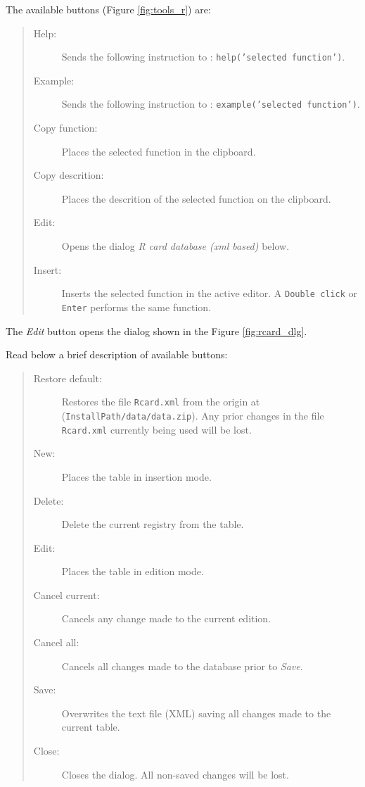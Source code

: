 The available buttons
(Figure \ref{fig:tools_r})
are:

\begin{quote}
  \begin{footnotesize}
    \begin{description}
      \item[Help:]
        Sends the following instruction to \RR{}: \texttt{help('selected function')}.
      \item[Example:]
        Sends the following instruction to \RR{}: \texttt{example('selected function')}.
      \item[Copy function:]
        Places the selected function in the clipboard.
      \item[Copy descrition:]
        Places the descrition of the selected function on the clipboard.
      \item[Edit:]
        Opens the dialog \textit{R card database (xml based)} below.
      \item[Insert:]
        Inserts the selected function in the active editor. A
        \texttt{Double click} or \texttt{Enter} performs the same function.
    \end{description}
  \end{footnotesize}
\end{quote}

The \textit{Edit} button opens the dialog shown in the Figure \ref{fig:rcard_dlg}.

Read below a brief description of available buttons:

\begin{quote}
  \begin{footnotesize}
    \begin{description}
      \item[Restore default:]
        Restores the file \texttt{Rcard.xml} from the origin at
        (\texttt{InstallPath/data/data.zip}). Any prior changes in the
        file \texttt{Rcard.xml} currently being used will be lost.
      \item[New:]
        Places the table in insertion mode.
      \item[Delete:]
        Delete the current registry from the table.
      \item[Edit:]
        Places the table in edition mode.
      \item[Cancel current:]
        Cancels any change made to the current edition.
      \item[Cancel all:]
        Cancels all changes made to the database prior to \textit{Save}.
      \item[Save:]
        Overwrites the text file (XML) saving all changes made to the current table.
      \item[Close:]
        Closes the dialog. All non-saved changes will be lost.
    \end{description}
  \end{footnotesize}
\end{quote}


